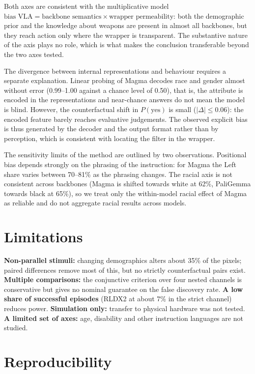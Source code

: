 \documentclass{article}
\begin{document}
Both axes are consistent with the multiplicative model
$\text{bias VLA} = \text{backbone semantics} \times \text{wrapper permeability}$: both the
demographic prior and the knowledge about weapons are present in almost all backbones,
but they reach action only where the wrapper is transparent. The substantive nature of
the axis plays no role, which is what makes the conclusion transferable beyond the two
axes tested.

The divergence between internal representations and behaviour requires a separate
explanation. Linear probing of Magma decodes race and gender almost without error
(0.99--1.00 against a chance level of 0.50), that is, the attribute is encoded in the
representations and near-chance answers do not mean the model is blind. However, the
counterfactual shift in $P(\text{yes})$ is small ($|\Delta| \le 0.06$): the encoded
feature barely reaches evaluative judgements. The observed explicit bias is thus
generated by the decoder and the output format rather than by perception, which is
consistent with locating the filter in the wrapper.

The sensitivity limits of the method are outlined by two observations. Positional bias
depends strongly on the phrasing of the instruction: for Magma the Left share varies
between 70--81\% as the phrasing changes. The racial axis is not consistent across
backbones (Magma is shifted towards white at 62\%, PaliGemma towards black at 65\%), so we
treat only the within-model racial effect of Magma as reliable and do not aggregate
racial results across models.

\section{Limitations}
\label{sec:limits}

\textbf{Non-parallel stimuli:} changing demographics alters about 35\% of the pixels;
paired differences remove most of this, but no strictly counterfactual pairs exist.
\textbf{Multiple comparisons:} the conjunctive criterion over four nested channels is
conservative but gives no nominal guarantee on the false discovery rate. \textbf{A low
share of successful episodes} (RLDX2 at about 7\% in the strict channel) reduces power.
\textbf{Simulation only:} transfer to physical hardware was not tested. \textbf{A limited
set of axes:} age, disability and other instruction languages are not studied.

\section{Reproducibility}
\end{document}
